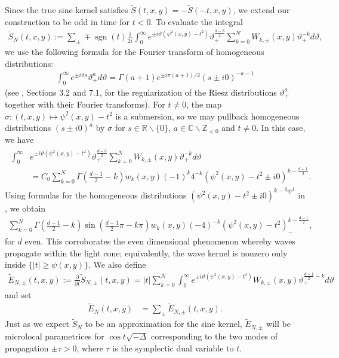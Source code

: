 \documentclass[11pt,letterpaper,oneside]{amsart}
\newcommand{\C}{\mathbb{C}}
\newcommand{\Z}{\mathbb{Z}}
\newcommand{\R}{\mathbb{R}}
\renewcommand{\theta}{\vartheta}
\theoremstyle{definition}
\theoremstyle{remark}
\newcommand{\wt}{\widetilde}
\renewcommand{\d}{\partial}
\theoremstyle{definition}
\theoremstyle{remark}
\DeclareMathOperator{\sgn}{sgn}
\begin{document}
Since the true sine kernel satisfies $\wt S(t,x,y) = - \wt S(-t,x,y)$, we extend our construction to be odd in time for $t<0$. To evaluate the integral
\begin{align*}
    \wt S_N(t,x,y) := \sum_{\pm} \mp  \sgn (t) \frac{1}{2i} \int_0^\infty e^{\pm i \theta (\psi^2(x,y)  - t^2)} \theta_+^{\frac{d-3}{2}}  \sum_{k = 0}^N W_{k,\pm}(x,y) \theta_+^{-k} d\theta,
\end{align*}
we use the following formula for the Fourier transform of homogeneous distributions:
\begin{align*}
    \int_0^\infty e^{\pm i \theta s} \theta_+^a d\theta = \Gamma(a + 1) e^{\pm i\pi (a+1)/2} (s \pm i 0)^{-a - 1}
\end{align*}
(see \cite{Ho90}, Sections $3.2$ and $7.1$, for the regularization of the Riesz distributions $\theta_+^a$ together with their Fourier transforms). For $t \neq 0$, the map $\sigma: (t,x,y)  \mapsto \psi^2(x,y) - t^2$ is a submersion, so we may pullback homogeneous distributions $(s \pm i 0)^{a}$ by $\sigma$ for $s \in \R \backslash \{0\}$, $a \in \C\backslash \Z_{< 0}$ and $t \neq 0$. In this case, we have
\begin{align}\label{FT}
    \begin{split}
        \int_0^\infty& e^{\pm i \theta (\psi^2(x,y)  - t^2)} \theta_+^{\frac{d-3}{2}}  \sum_{k = 0}^N W_{k, \pm}(x,y) \theta_+^{-k} d\theta
        \\
        & = C_0 \sum_{k = 0}^N \Gamma\left( \frac{d-1}{2} - k\right) w_{k}(x,y) (-1)^k 4^{-k} \left(\psi^2(x,y)  - t^2 \pm i 0 \right)^{k - \frac{d-1}{2}}.
    \end{split}
\end{align}
Using formulas for the homogeneous distributions $(\psi^2(x,y) - t^2 \pm i 0)^{k - \frac{d-1}{2}}$ in \cite{Ho90}, we obtain
\begin{align*}
    \sum_{k =0}^N \Gamma\left( \frac{d-1}{2} - k\right) \sin \left(\frac{d-1}{2} \pi - k \pi \right) w_k(x,y) (-4)^{-k} (\psi^2(x,y)  - t^2)_-^{k - \frac{d-1}{2}},
\end{align*}
for $d$ even. This corroborates the even dimensional phenomenon whereby waves propagate within the light cone; equivalently, the wave kernel is nonzero only inside $\{|t| \geq \psi(x,y)\}$. We also define
\begin{align*}
    \wt E_{N,\pm}(t,x,y) := \frac{\d}{\d t} \wt S_{N, \pm}(t,x,y)
    =  |t| \sum_{k = 0}^N \int_0^\infty e^{\pm i \theta (\psi^2(x,y)  - t^2)} W_{k,\pm}(x,y) \theta_+^{\frac{d -1}{2} - k} d\theta
\end{align*}
and set
\begin{align}\label{ENplusminus}
    \wt E_N(t,x,y) &= \sum_{\pm} \wt E_{N,\pm} (t,x,y).
\end{align}
Just as we expect $\wt S_N$ to be an approximation for the sine kernel, $\wt E_{N,\pm}$ will be microlocal parametrices for $\cos t \sqrt{- \Delta}$ corresponding to the two modes of propagation $\pm \tau > 0$, where $\tau$ is the symplectic dual variable to $t$.
\end{document}
